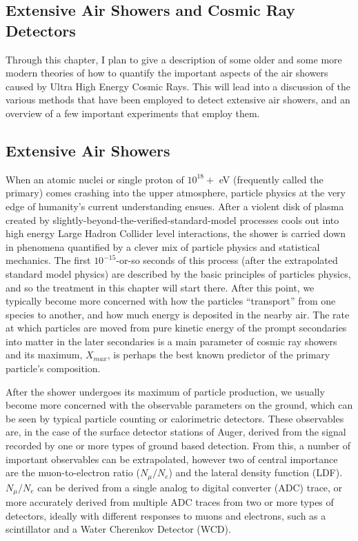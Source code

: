 \begin{singlespace}
\chapter{Extensive Air Showers and Cosmic Ray Detectors} %
\end{singlespace}
Through this chapter, I plan to give a description of some older and some more modern theories of how to quantify the important aspects of the air showers caused by Ultra High Energy Cosmic Rays. This will lead into a discussion of the various methods that have been employed to detect extensive air showers, and an overview of a few important experiments that employ them.
\section{Extensive Air Showers}
When an atomic nuclei or single proton of $10^{18}+$ eV (frequently called the primary) comes crashing into the upper atmosphere, particle physics at the very edge of humanity's current understanding ensues. After a violent disk of plasma created by slightly-beyond-the-verified-standard-model processes cools out into high energy Large Hadron Collider level interactions, the shower is carried down in phenomena quantified by a clever mix of particle physics and statistical mechanics. The first $10^{-15}$-or-so seconds of this process (after the extrapolated standard model physics) are described by the basic principles of particles physics, and so the treatment in this chapter will start there. After this point, we typically become more concerned with how the particles ``transport'' from one species to another, and how much energy is deposited in the nearby air. The rate at which particles are moved from pure kinetic energy of the prompt secondaries into matter in the later secondaries is a main parameter of cosmic ray showers and its maximum, $X_{max}$, is perhaps the best known predictor of the primary particle's composition.

After the shower undergoes its maximum of particle production, we usually become more concerned with the observable parameters on the ground, which can be seen by typical particle counting or calorimetric detectors. These observables are, in the case of the surface detector stations of Auger, derived from the signal recorded by one or more types of ground based detection. From this, a number of important observables can be extrapolated, however two of central importance are the muon-to-electron ratio ($N_{\mu}/N_e$) and the lateral density function (LDF). $N_{\mu}/N_e$ can be derived from a single analog to digital converter (ADC) trace, or more accurately derived from multiple ADC traces from two or more types of detectors, ideally with different responses to muons and electrons, such as a scintillator and a Water Cherenkov Detector (WCD).

